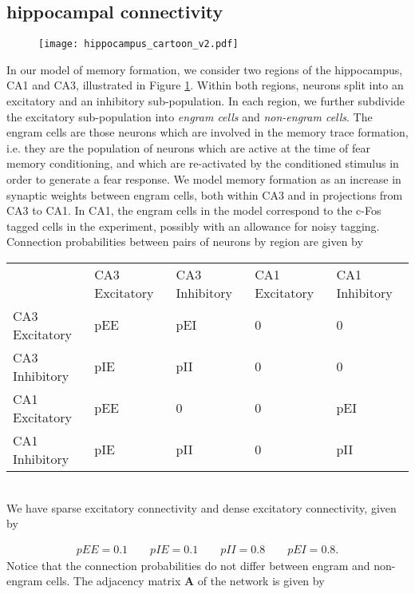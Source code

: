 \documentclass [12pt]{amsart}
\newcommand{\matr}[1]{\mathbf{#1}} %
\theoremstyle{definition}
\begin{document}
\subsection{hippocampal connectivity}

\begin{figure}
\texttt{[image: hippocampus\_cartoon\_v2.pdf]}
\caption{\label{fig:hippocampus}}
\end{figure}

In our model of memory formation, we consider two regions of the hippocampus, CA1 and CA3, illustrated in Figure \ref{fig:hippocampus}. Within both regions, neurons split into an excitatory and an inhibitory sub-population. In each region, we further subdivide the excitatory sub-population into \emph{engram cells} and \emph{non-engram cells}. The engram cells are those neurons which are involved in the memory trace formation, i.e. they are the population of neurons which are active at the time of fear memory conditioning, and which are re-activated by the conditioned stimulus in order to generate a fear response. We model memory formation as an increase in synaptic weights between engram cells, both within CA3 and in projections from CA3 to CA1. In CA1, the engram cells in the model correspond to the c-Fos tagged cells in the experiment, possibly with an allowance for noisy tagging. 
Connection probabilities between pairs of neurons by region are given by 
\begin{table}[ht!]
\begin{tabular}{lllll}
               & CA3 Excitatory & CA3 Inhibitory & CA1 Excitatory & CA1 Inhibitory \\ 
CA3 Excitatory & pEE            & pEI            & 0              & 0              \\
CA3 Inhibitory & pIE            & pII            & 0              & 0              \\
CA1 Excitatory & pEE            & 0              & 0              & pEI            \\
CA1 Inhibitory & pIE            & pII            & 0              & pII            \\     
\end{tabular}\\

We have sparse excitatory connectivity and dense excitatory connectivity, given by
\end{table}
\begin{align*}
pEE = 0.1\qquad
pIE = 0.1\qquad
pII = 0.8\qquad
pEI = 0.8.
\end{align*}
Notice that the connection probabilities do not differ between engram and non-engram cells. 
The adjacency matrix $\matr A$ of the network is given by 
\end{document}

